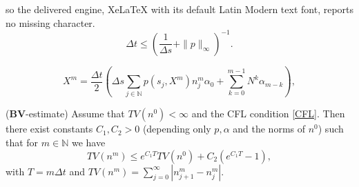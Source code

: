 \documentclass[10pt,a4paper]{amsart}
\newcommand{\N}{\mathbb{N}}
\begin{document}
so the delivered engine, XeLaTeX with its default Latin Modern text font, reports no missing character.
 \begin{equation}\label{CFL}
     \Delta t \le \left(\frac{1}{\Delta s}+\|p\|_\infty\right)^{-1}.
 \end{equation}

\begin{equation}\label{eq:findX}
    X^m=\frac{\Delta t}{2} \left( \Delta s \sum_{j\in\N}p(s_j,X^m)n_j^m \alpha_0 + \sum_{k=0}^{m-1} N^k\alpha_{m-k} \right),
\end{equation}

\begin{lemma}{(\textbf{BV}-estimate)}
\label{BV-lem-d}
Assume that $TV(n^0)<\infty$ and the CFL condition \eqref{CFL}. Then there exist constants $C_1,C_2>0$ (depending only $p,\alpha$ and the norms of $n^0$) such that for $m\in\N$ we have
\begin{equation}
    TV(n^m)\le e^{C_1T} TV(n^0)+C_2(e^{C_1T}-1),
    \label{BV_estimate-d}
\end{equation}
with  $T=m\Delta t$ and $TV(n^m)= \displaystyle\sum_{j=0}^\infty|n_{j+1}^{m}-n_{j}^{m}|$.
\end{lemma}
\end{document}
